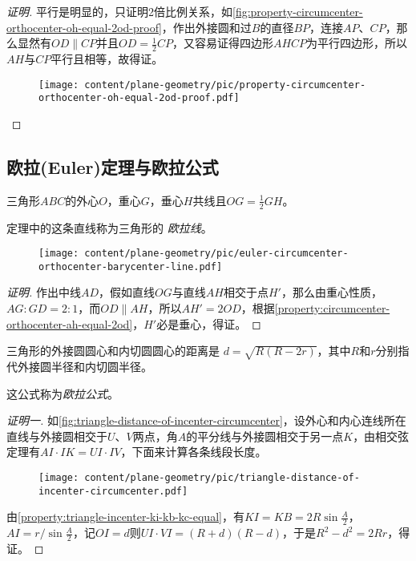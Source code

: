 \begin{proof}[证明]
  平行是明显的，只证明2倍比例关系，如\autoref{fig:property-circumcenter-orthocenter-oh-equal-2od-proof}，作出外接圆和过$B$的直径$BP$，连接$AP$、$CP$，那么显然有$OD \parallel CP$并且$OD=\frac{1}{2}CP$，又容易证得四边形$AHCP$为平行四边形，所以$AH$与$CP$平行且相等，故得证。

\begin{figure}[htbp]
\centering
\texttt{[image: content/plane-geometry/pic/property-circumcenter-orthocenter-oh-equal-2od-proof.pdf]}
\caption{}
\label{fig:property-circumcenter-orthocenter-oh-equal-2od-proof}
\end{figure}

\end{proof}

\subsection{欧拉(Euler)定理与欧拉公式}
\label{sec:euler-theorem-and-euler-formula}

\begin{theorem}[欧拉(Euler)定理]
  三角形$ABC$的外心$O$，重心$G$，垂心$H$共线且$OG=\frac{1}{2}GH$。
\end{theorem}

定理中的这条直线称为三角形的 \emph{欧拉线}。

\begin{figure}[htbp]
\centering
\texttt{[image: content/plane-geometry/pic/euler-circumcenter-orthocenter-barycenter-line.pdf]}
\caption{}
\label{fig:euler-circumcenter-orthocenter-barycenter-line}
\end{figure}

\begin{proof}[证明]
  作出中线$AD$，假如直线$OG$与直线$AH$相交于点$H'$，那么由重心性质，$AG:GD=2:1$，而$OD \parallel AH$，所以$AH'=2OD$，根据\autoref{property:circumcenter-orthocenter-ah-equal-2od}，$H'$必是垂心，得证。
\end{proof}

\begin{theorem}
  三角形的外接圆圆心和内切圆圆心的距离是 $d=\sqrt{R(R-2r)}$，其中$R$和$r$分别指代外接圆半径和内切圆半径。
\end{theorem}

这公式称为\emph{欧拉公式}。

\begin{proof}[证明一]
  如\autoref{fig:triangle-distance-of-incenter-circumcenter}，设外心和内心连线所在直线与外接圆相交于$U$、$V$两点，角$A$的平分线与外接圆相交于另一点$K$，由相交弦定理有$AI \cdot IK = UI \cdot IV$，下面来计算各条线段长度。
 
\begin{figure}[htbp]
\centering
\texttt{[image: content/plane-geometry/pic/triangle-distance-of-incenter-circumcenter.pdf]}
\caption{}
\label{fig:triangle-distance-of-incenter-circumcenter}
\end{figure}

由\autoref{property:triangle-incenter-ki-kb-kc-equal}，有$KI=KB=2R\sin{\frac{A}{2}}$，$AI=r/ \sin{\frac{A}{2}}$，记$OI=d$则$UI\cdot VI=(R+d)(R-d)$，于是$R^2-d^2=2Rr$，得证。
\end{proof}


